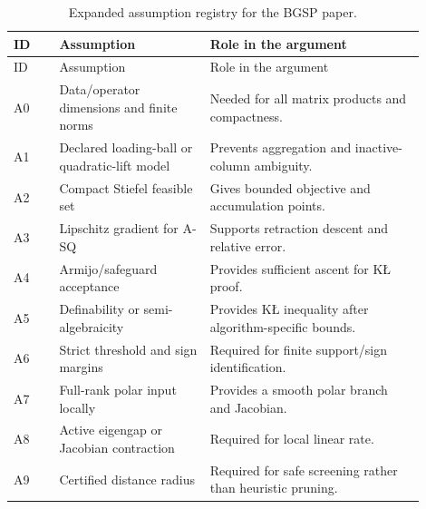 \begin{longtable}{p{0.10\linewidth}p{0.33\linewidth}p{0.47\linewidth}}
\caption{Expanded assumption registry for the BGSP paper.}\label{tab:a-assumption-registry}\\
\toprule
ID & Assumption & Role in the argument \\
\midrule
\endfirsthead
\toprule
ID & Assumption & Role in the argument \\
\midrule
\endhead
A0 & Data/operator dimensions and finite norms & Needed for all matrix products and compactness. \\
A1 & Declared loading-ball or quadratic-lift model & Prevents aggregation and inactive-column ambiguity. \\
A2 & Compact Stiefel feasible set & Gives bounded objective and accumulation points. \\
A3 & Lipschitz gradient for A-SQ & Supports retraction descent and relative error. \\
A4 & Armijo/safeguard acceptance & Provides sufficient ascent for KŁ proof. \\
A5 & Definability or semi-algebraicity & Provides KŁ inequality after algorithm-specific bounds. \\
A6 & Strict threshold and sign margins & Required for finite support/sign identification. \\
A7 & Full-rank polar input locally & Provides a smooth polar branch and Jacobian. \\
A8 & Active eigengap or Jacobian contraction & Required for local linear rate. \\
A9 & Certified distance radius & Required for safe screening rather than heuristic pruning. \\
\bottomrule
\end{longtable}
